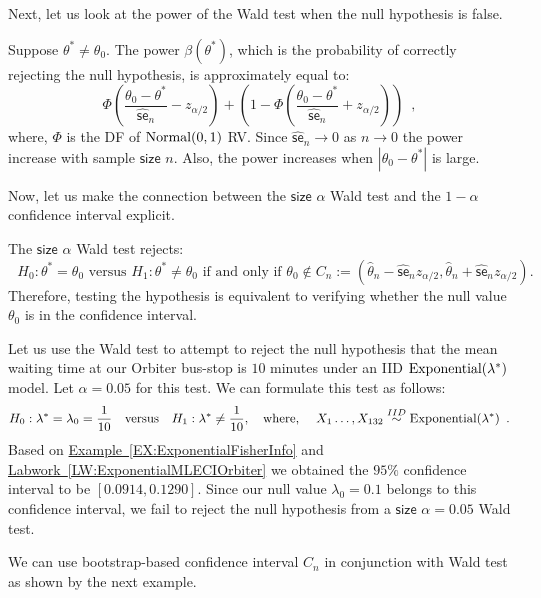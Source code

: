 Next, let us look at the power of the Wald test when the null hypothesis is false.
\begin{prop}
Suppose $\theta^* \neq \theta_0$.  The power $\beta(\theta^*)$, which is the probability of correctly rejecting the null hypothesis, is approximately equal to:
\[
\boxed{
\Phi \left( \frac{\theta_0-\theta^*}{\widehat{\mathsf{se}}_n} - z_{\alpha/2} \right) +
\left( 1- \Phi \left( \frac{\theta_0-\theta^*}{\widehat{\mathsf{se}}_n} + z_{\alpha/2} \right) \right) \enspace ,
}
\]
where, $\Phi$ is the DF of $\mbox{{\rm Normal}}(0,1)$ RV.  Since ${\widehat{\mathsf{se}}_n} \to 0$ as $n \to 0$ the power increase with sample $\mathsf{size}$ $n$.  Also, the power increases when $|\theta_0-\theta^*|$ is large. 
\end{prop}
Now, let us make the connection between the $\mathsf{size}$ $\alpha$ Wald test and the $1-\alpha$ confidence interval explicit.
\begin{prop}
The $\mathsf{size}$ $\alpha$ Wald test rejects:
\[
\boxed{
\text{ $H_0: \theta^*=\theta_0$ versus $H_1: \theta^* \neq \theta_0$ if and only if $\theta_0 \notin C_n := (\widehat{\theta}_n-{\widehat{\mathsf{se}}_n} z_{\alpha/2}, \widehat{\theta}_n+{\widehat{\mathsf{se}}_n} z_{\alpha/2})$.
}}
\]
Therefore, testing the hypothesis is equivalent to verifying whether the null value $\theta_0$ is in the confidence interval.
\end{prop}
\begin{example}
Let us use the Wald test to attempt to reject the null hypothesis that the mean waiting time at our Orbiter bus-stop is $10$ minutes under an IID $\mbox{{\rm Exponential}}(\lambda^*)$ model.  Let $\alpha=0.05$ for this test.  We can formulate this test as follows:
\[
H_0: \lambda^* = \lambda_0= \frac{1}{10} \quad \text{versus} \quad H_1: \lambda^* \neq \frac{1}{10}, \quad \text{where, } \quad X_1\ldots,X_{132} \overset{IID}{\sim} \mbox{{\rm Exponential}}(\lambda^*) \enspace .
\]
Based on \hyperref[EX:ExponentialFisherInfo]{Example~\ref*{EX:ExponentialFisherInfo}} and \hyperref[LW:ExponentialMLECIOrbiter]{Labwork~\ref*{LW:ExponentialMLECIOrbiter}} we obtained the $95\%$ confidence interval to be $[0.0914, 0.1290]$. Since our null value $\lambda_0=0.1$ belongs to this confidence interval, we fail to reject the null hypothesis from a $\mathsf{size}$ $\alpha=0.05$ Wald test.
\end{example}

We can use bootstrap-based confidence interval $C_n$ in conjunction with Wald test as shown by the next example.

